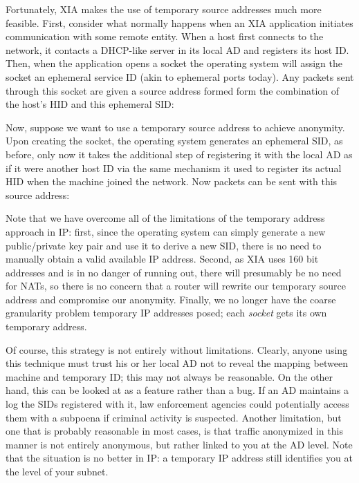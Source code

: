 \documentclass{article}
\newcommand{\entrynode}[1]{
  \SetVertexNormal[Shape      = circle,
                   FillColor  = black,
                   LineWidth  = 0pt,
                   MinSize    = 0pt]
  \Vertex[L={\tiny\,}]{#1}
  \SetVertexNormal[Shape      = circle,
                   FillColor  = white,
                   LineWidth  = 2pt]
}
\begin{document}
Fortunately, XIA makes the use of temporary source addresses much more feasible. First, consider what normally happens when an XIA application initiates communication with some remote entity. When a host first connects to the network, it contacts a DHCP-like server in its local AD and registers its host ID. Then, when the application opens a socket the operating system will assign the socket an ephemeral service ID (akin to ephemeral ports today). Any packets sent through this socket are given a source address formed form the combination of the host's HID and this ephemeral SID:
\begin{center}
\end{center}
Now, suppose we want to use a temporary source address to achieve anonymity. Upon creating the socket, the operating system generates an ephemeral SID, as before, only now it takes the additional step of registering it with the local AD as if it were another host ID via the same mechanism it used to register its actual HID when the machine joined the network. Now packets can be sent with this source address:
\begin{center}
\end{center}
Note that we have overcome all of the limitations of the temporary address approach in IP: first, since the operating system can simply generate a new public/private key pair and use it to derive a new SID, there is no need to manually obtain a valid available IP address. Second, as XIA uses 160 bit addresses and is in no danger of running out, there will presumably be no need for NATs, so there is no concern that a router will rewrite our temporary source address and compromise our anonymity. Finally, we no longer have the coarse granularity problem temporary IP addresses posed; each {\em socket} gets its own temporary address.

Of course, this strategy is not entirely without limitations. Clearly, anyone using this technique must trust his or her local AD not to reveal the mapping between machine and temporary ID; this may not always be reasonable. On the other hand, this can be looked at as a feature rather than a bug. If an AD maintains a log the SIDs registered with it, law enforcement agencies could potentially access them with a subpoena if criminal activity is suspected. Another limitation, but one that is probably reasonable in most cases, is that traffic anonymized in this manner is not entirely anonymous, but rather linked to you at the AD level. Note that the situation is no better in IP: a temporary IP address still identifies you at the level of your subnet.
\end{document}
